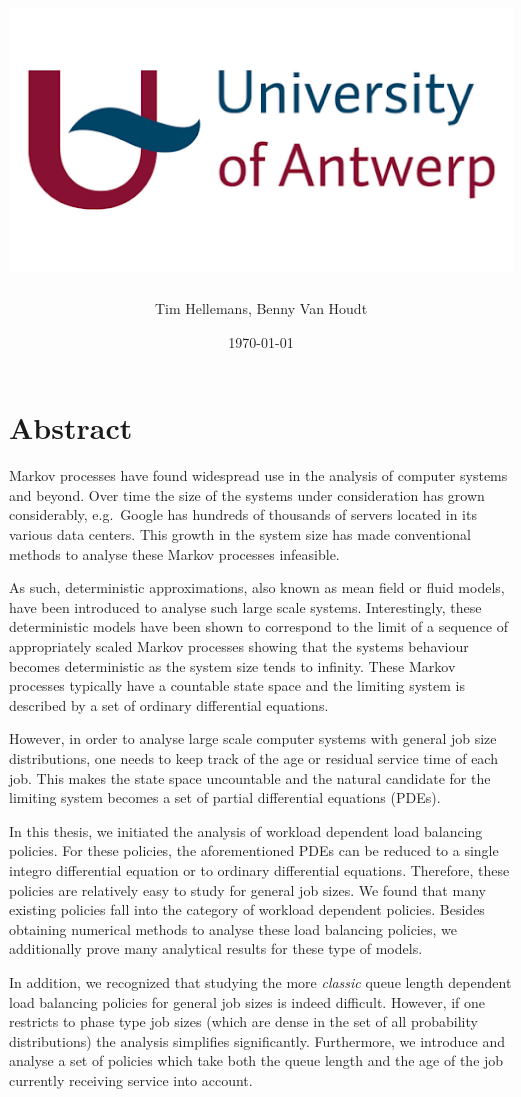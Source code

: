 \documentclass[12pt]{report}
\title{
\makebox[0pt]{Mean Field Analysis for the Power of $d$ Choices.}\\
{\includegraphics[scale=0.2]{figures/Chapter1/logo_ua.png}}
}
\author{Tim Hellemans, Benny Van Houdt}
\date{\today}
\begin{document}
	
\captionsetup{justification=raggedright,singlelinecheck=false}

\maketitle

\tableofcontents

\chapter*{Abstract}
Markov processes have found widespread use in the analysis of computer systems and beyond. Over time the size of the systems under consideration has grown considerably, e.g.~Google has hundreds
of thousands of servers located in its various data centers. This growth in the system size has made
conventional methods to analyse these Markov processes infeasible.

As such, deterministic approximations, also known as mean field or fluid models, have been
introduced to analyse such large scale systems. Interestingly, these deterministic models have been
shown to correspond to the limit of a sequence of appropriately scaled Markov processes showing
that the systems behaviour becomes deterministic as the system size tends to infinity.
These Markov processes typically have a countable state space and the limiting system is described
by a set of ordinary differential equations.

However, in order to analyse large scale computer
systems with general job size distributions, one needs to keep track of the age or residual service
time of each job. This makes the state space uncountable and the natural candidate for the limiting
system becomes a set of partial differential equations (PDEs).

In this thesis, we initiated the analysis of workload dependent load balancing policies. For these policies, the aforementioned PDEs can be reduced to a single integro differential equation or to ordinary differential equations. Therefore, these policies are relatively easy to study for general job sizes. We found that many existing policies fall into the category of workload dependent policies. Besides obtaining numerical methods to analyse these load balancing policies, we additionally prove many analytical results for these type of models.

In addition, we recognized that studying the more \textit{classic} queue length dependent load balancing policies for general job sizes is indeed difficult. However, if one restricts to phase type job sizes (which are dense in the set of all probability distributions) the analysis simplifies significantly. Furthermore, we introduce and analyse a set of policies which take both the queue length and the age of the job currently receiving service into account.
\end{document}
